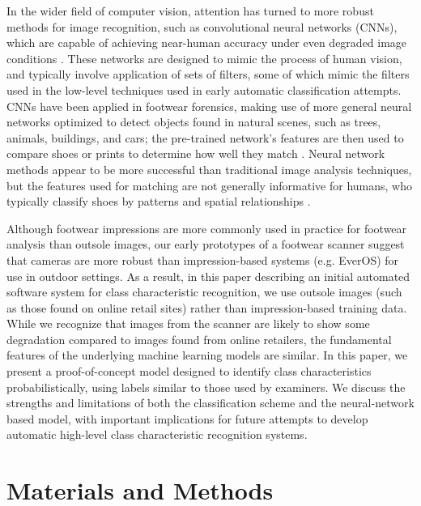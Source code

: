 \documentclass{article}\usepackage[]{graphicx}\usepackage[table]{xcolor}
\begin{document}
In the wider field of computer vision, attention has turned to more robust methods for image recognition, such as convolutional neural networks (CNNs), which are capable of achieving near-human accuracy under even degraded image conditions \citep{krizhevskyImageNetClassificationDeep2012}. These networks are designed to mimic the process of human vision, and typically involve application of sets of filters, some of which mimic the filters used in the low-level techniques used in early automatic classification attempts. CNNs have been applied in footwear forensics, making use of more general neural networks optimized to detect objects found in natural scenes, such as trees, animals, buildings, and cars; the pre-trained network's features are then used to compare shoes or prints to determine how well they match \citep{kongCrossDomainImageMatching2019a,kongCrossDomainForensicShoeprint2017,zhangAdaptingConvolutionalNeural2017}. Neural network methods appear to be more successful than traditional image analysis techniques, but the features used for matching are not generally informative for humans, who typically classify shoes by patterns and spatial relationships \citep{davisIntelligenceApproachFootwear1981,grossVariabilitySignificanceClass2013}.


Although footwear impressions are more commonly used in practice for footwear analysis than outsole images, our early prototypes of a footwear scanner suggest that cameras are more robust than impression-based systems (e.g.  EverOS) for use in outdoor settings. As a result, in this paper describing an initial automated software system for class characteristic recognition, we use outsole images (such as those found on online retail sites) rather than impression-based training data. While we recognize that images from the scanner are likely to show some degradation compared to images found from online retailers, the fundamental features of the underlying machine learning models are similar. In this paper, we present a proof-of-concept model designed to identify class characteristics probabilistically, using labels similar to those used by examiners. We discuss the strengths and limitations of both the classification scheme and the neural-network based model, with important implications for future attempts to develop automatic high-level class characteristic recognition systems.


\section{Materials and Methods}
\end{document}
